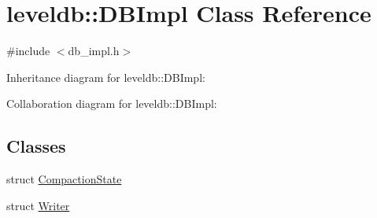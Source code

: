 \hypertarget{classleveldb_1_1_d_b_impl}{}\section{leveldb\+:\+:D\+B\+Impl Class Reference}
\label{classleveldb_1_1_d_b_impl}


{\ttfamily \#include $<$db\+\_\+impl.\+h$>$}



Inheritance diagram for leveldb\+:\+:D\+B\+Impl\+:


Collaboration diagram for leveldb\+:\+:D\+B\+Impl\+:
\subsection*{Classes}
\begin{DoxyCompactItemize}
\item 
struct \hyperlink{structleveldb_1_1_d_b_impl_1_1_compaction_state}{Compaction\+State}
\item 
struct \hyperlink{structleveldb_1_1_d_b_impl_1_1_writer}{Writer}
\end{DoxyCompactItemize}
